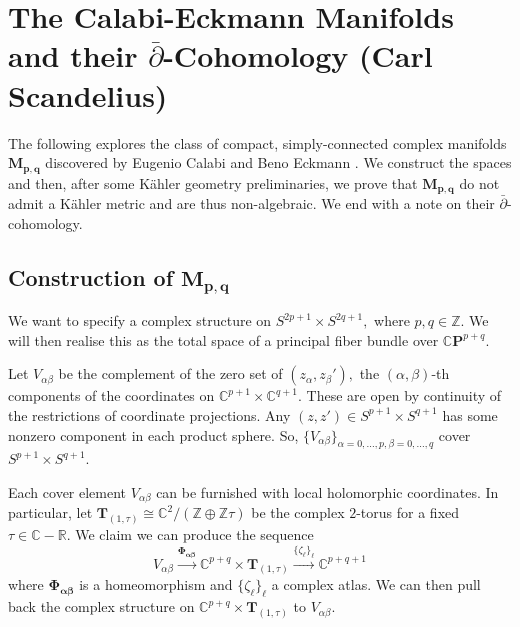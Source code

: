 \section{The Calabi-Eckmann Manifolds and their 
\texorpdfstring{$\bar\partial$}{delbar}-Cohomology (Carl Scandelius)}


\noindent The following explores the class of compact, simply-connected complex manifolds $\mathbf{M_{p,q}}$ discovered by Eugenio Calabi and Beno Eckmann \cite{CE1953}. We construct the spaces and then, after some K\"ahler geometry preliminaries, we prove that $\mathbf{M_{p,q}}$ do not admit a K\"ahler metric and are thus non-algebraic. We end with a note on their $\bar\partial$-cohomology.

\subsection{Construction of $\mathbf{M_{p,q}}$}

We want to specify a complex structure on $S^{2p+1} \times S^{2q + 1},$ where $p,q \in \mathbb{Z}.$ We will then realise this as the total space of a principal fiber bundle over $\mathbb{C}\mathbf{P}^{p+q}.$

Let $V_{\alpha\beta}$ be the complement of the zero set of $(z_\alpha, z_\beta'),$ the $(\alpha,\beta)$-th components of the coordinates on $\mathbb{C}^{p+1}\times \mathbb{C}^{q+1}.$ These are open by continuity of the restrictions of coordinate projections. Any $(z,z')\in S^{p+1}\times S^{q+1}$ has some nonzero component in each product sphere. So, $\{V_{\alpha\beta}\}_{\alpha = 0,\dots, p, \beta = 0,\dots, q}$ cover $S^{p+1}\times S^{q+1}.$ 

\begin{theorem}
    Each cover element $V_{\alpha\beta}$ can be furnished with local holomorphic coordinates. In particular, let $\mathbf{T}_{(1,\tau)} \cong \mathbb{C}^2/(\mathbb{Z} \oplus \mathbb{Z}\tau)$ be the complex $2$-torus for a fixed $\tau \in \mathbb{C}-\mathbb{R}.$ We claim we can produce the sequence
    \[
    V_{\alpha\beta} \xrightarrow{\mathbf{\Phi_{\alpha\beta}}} \mathbb{C}^{p+q}\times \mathbf{T}_{(1,\tau)} \xrightarrow{\{\zeta_\ell\}_\ell} \mathbb{C}^{p+q+1}
    \]
    where $\mathbf{\Phi_{\alpha \beta}}$ is a homeomorphism and $\{\zeta_\ell\}_\ell$ a complex atlas. We can then pull back the complex structure on $\mathbb{C}^{p+q}\times \mathbf{T}_{(1,\tau)}$ to $V_{\alpha \beta}.$
\end{theorem}

